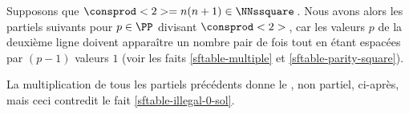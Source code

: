 Supposons que $\consprod<2> = n(n+1) \in \NNssquare$\,. Nous avons alors les \sftab[x] partiels suivants pour $p \in \PP$ divisant $\consprod<2>$\,, car les valeurs $p$ de la deuxième ligne doivent apparaître un nombre pair de fois tout en étant espacées par $(p-1)$ valeurs $1$ (voir les faits \ref{sftable-multiple} et \ref{sftable-parity-square}).

\begin{center}
\end{center}


La multiplication de tous les \sftab[x] partiels précédents donne le \sftab, non partiel, ci-après, mais ceci contredit le fait \ref{sftable-illegal-0-sol}.

\begin{center}
\end{center}
